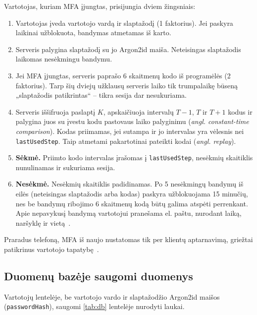 Vartotojas, kuriam MFA įjungtas, prisijungia dviem žingsniais:
\begin{enumerate}
    \item Vartotojas įveda vartotojo vardą ir slaptažodį (1 faktorius). Jei paskyra laikinai užblokuota, bandymas atmetamas iš karto.
    \item Serveris palygina slaptažodį su jo Argon2id maiša. Neteisingas slaptažodis laikomas nesėkmingu bandymu.
    \item Jei MFA įjungtas, serveris paprašo 6 skaitmenų kodo iš programėlės (2 faktorius). Tarp šių dviejų užklausų serveris laiko tik trumpalaikę būseną „slaptažodis patikrintas“ -- tikra sesija dar nesukuriama.
    \item Serveris iššifruoja paslaptį $K$, apskaičiuoja intervalų $T-1$, $T$ ir $T+1$ kodus ir palygina juos su įvestu kodu pastovaus laiko palyginimu (\textit{angl. constant-time comparison}). Kodas priimamas, jei sutampa ir jo intervalas yra vėlesnis nei \texttt{lastUsedStep}. Taip atmetami pakartotinai pateikti kodai (\textit{angl. replay}).
    \item \textbf{Sėkmė.} Priimto kodo intervalas įrašomas į \texttt{lastUsedStep}, nesėkmių skaitiklis nunulinamas ir sukuriama sesija.
    \item \textbf{Nesėkmė.} Nesėkmių skaitiklis padidinamas. Po 5 nesėkmingų bandymų iš eilės (neteisingas slaptažodis arba kodas) paskyra užblokuojama 15 minučių, nes be bandymų ribojimo 6 skaitmenų kodą būtų galima atspėti perrenkant. Apie nepavykusį bandymą vartotojui pranešama el. paštu, nurodant laiką, naršyklę ir vietą~\cite{VMA}.
\end{enumerate}

Praradus telefoną, MFA iš naujo nustatomas tik per klientų aptarnavimą, griežtai patikrinus vartotojo tapatybę~\cite{VMA}.

\subsection{Duomenų bazėje saugomi duomenys}
\label{subsec:duomenu_baze}

Vartotojų lentelėje, be vartotojo vardo ir slaptažodžio Argon2id maišos (\texttt{passwordHash}), saugomi \ref{tab:db} lentelėje nurodyti laukai.


